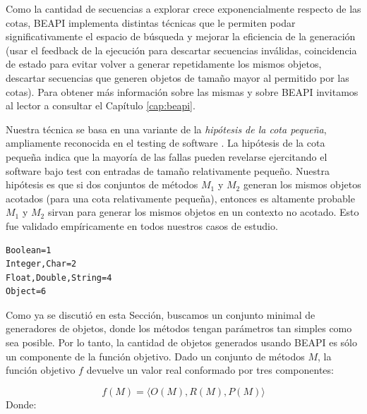 Como la cantidad de secuencias a explorar crece exponencialmente respecto de las cotas, BEAPI implementa distintas técnicas que le permiten podar significativamente el espacio de búsqueda y mejorar la eficiencia de la generación (usar el feedback de la ejecución para descartar secuencias inválidas, coincidencia de estado para evitar volver a generar repetidamente los mismos objetos, descartar secuencias que generen objetos de tamaño mayor al permitido por las cotas). Para obtener más información sobre las mismas y sobre BEAPI invitamos al lector a consultar el Capítulo \ref{cap:beapi}.

Nuestra técnica se basa en una variante de la \emph{hipótesis de la cota pequeña}, ampliamente reconocida en el testing de software \cite{Andoni:2003,jackson2006, Abad13}. La hipótesis de la cota pequeña indica que la mayoría de las fallas pueden revelarse ejercitando el software bajo test con entradas de tamaño relativamente pequeño. Nuestra hipótesis es que si dos conjuntos de métodos $M_1$ y $M_2$ generan los mismos objetos acotados (para una cota relativamente pequeña), entonces es altamente probable $M_1$ y $M_2$ sirvan para generar los mismos objetos en un contexto no acotado. Esto fue validado empíricamente en todos nuestros casos de estudio.

\begin{lstlisting}[label=fig:rankParameters,caption=Ranking con los tipos de parametros, captionpos=b,frame=tb, float=t]
Boolean=1
Integer,Char=2
Float,Double,String=4
Object=6
\end{lstlisting}

Como ya se discutió en esta Sección, buscamos un conjunto minimal de generadores de objetos, donde los métodos tengan parámetros tan simples como sea posible. Por lo tanto, la cantidad de objetos generados usando BEAPI es sólo un componente de la función objetivo. Dado un conjunto de métodos $M$, la función objetivo $f$ devuelve un valor real conformado por tres componentes:

\[
f(M) = \langle O(M), R(M), P(M) \rangle
\]
Donde:

